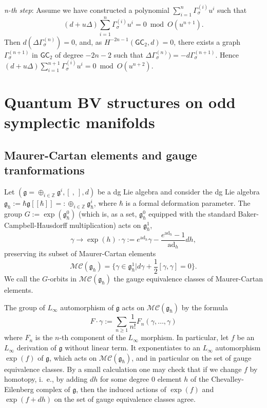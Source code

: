 \documentclass{amsart}
\theoremstyle{plain}
\theoremstyle{definition}
\begin{document}
{\em n-th step}: Assume we have constructed  a polynomial $\sum_{i=1}^n  {\Gamma}_\sigma^{(i)}{u}^i$ such that
 $$
(d +{u} \Delta) \sum_{i=1}^n  {\Gamma}_\sigma^{(i)}{u}^i=0 \bmod O({u}^{n+1}).
$$
Then $d (\Delta {\Gamma}_\sigma^{(n)})=0$, and, as  $H^{-2n-1}( {{\mathsf G}}{{\mathsf C}}_2, d)=0$, there exists a  graph
${\Gamma}_\sigma^{(n+1)}$ in ${{\mathsf G}}{{\mathsf C}}_2$ of degree $-2n-2$ such that $\Delta {\Gamma}_\sigma^{(n)})=- d {\Gamma}_\sigma^{(n+1)}$. Hence $(d +{u} \Delta) \sum_{i=1}^{n+1}  {\Gamma}_\sigma^{(i)}{u}^i=0 \bmod O({u}^{n+2})$.

{\bigskip}

{\bigskip}

{\large
\section{\bf Quantum BV structures on odd symplectic manifolds}
}

{\bigskip}

\subsection{Maurer-Cartan elements and gauge tranformations}
Let $({{\mathfrak g}}=\oplus_{i\in {{\mathbb Z}}} {{\mathfrak g}}^i, [\ ,\ ], d)$ be a dg Lie algebra and consider the dg Lie algebra ${{\mathfrak g}}_\hbar := \hbar {{\mathfrak g}}[[\hbar]]=:\oplus_{i\in {{\mathbb Z}}} {{\mathfrak g}}^i_\hbar$, where $\hbar$ is a formal deformation parameter.
The group $G:=\exp({{\mathfrak g}}_{\hbar}^0)$ (which is, as a set, ${{\mathfrak g}}_{\hbar}^0$ equipped with the standard Baker-Campbell-Hausdorff  multiplication) acts on ${{\mathfrak g}}^1_\hbar$,
$$
{\gamma} {\rightarrow} \exp(h)\cdot {\gamma}:= e^{\mathrm{ad}_h}{\gamma} -\frac{e^{\mathrm{ad}_h}-1}{\mathrm{ad}_h}dh,
$$
preserving its subset of Maurer-Cartan elements
$$
{{\mathcal M}}{{\mathcal C}}({{\mathfrak g}}_\hbar) = \{{\gamma}\in {{\mathfrak g}}^1_\hbar | d{\gamma} + \frac{1}{2}[{\gamma},{\gamma}]=0\}.
$$
We call the $G$-orbits in ${{\mathcal M}}{{\mathcal C}}({{\mathfrak g}}_\hbar)$ the gauge equivalence classes of Maurer-Cartan elements.

 {\smallskip}

The group of $L_\infty$ automorphism of ${{\mathfrak g}}$ acts on ${{\mathcal M}}{{\mathcal C}}({{\mathfrak g}}_\hbar)$ by the formula
$$
F\cdot {\gamma} := \sum_{n\geq 1}\frac{1}{n!} F_n({\gamma}, \ldots, {\gamma})
$$
where $F_n$ is the $n$-th component of the $L_\infty$ morphism.
In particular, let $f$ be an $L_\infty$ derivation of ${{\mathfrak g}}$ without linear term. It exponentiates to an $L_\infty$ automorphism $\exp(f)$ of ${{\mathfrak g}}$, which acts on ${{\mathcal M}}{{\mathcal C}}({{\mathfrak g}}_\hbar)$, and in particular on the set of gauge equivalence classes.
By a small calculation one may check that if we change $f$ by homotopy, i.~e., by adding $dh$ for some degree 0 element $h$ of the Chevalley-Eilenberg complex of ${{\mathfrak g}}$, then the induced actions of $\exp(f)$ and $\exp(f+dh)$ on the set of gauge equivalence classes agree.
\end{document}
